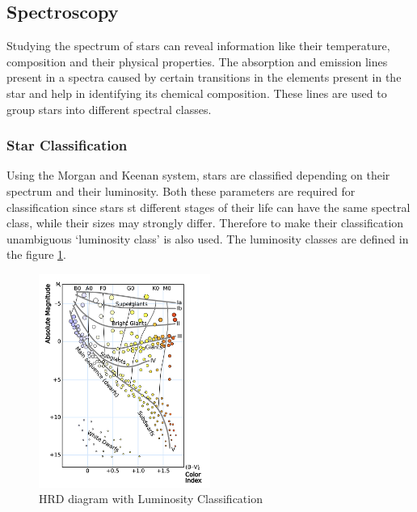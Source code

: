 \documentclass[12pt,a4paper]{article}
\begin{document}
  \subsection{Spectroscopy}
    Studying the spectrum of stars can reveal information like their temperature, composition and their physical properties. The absorption and emission lines present 
    in a spectra caused by certain transitions in the elements present in the star and help in identifying its chemical composition. These lines are used to group
    stars into different spectral classes. \\

    \subsubsection{Star Classification}
    Using the Morgan and Keenan system, stars are classified depending on their spectrum and their luminosity. Both these parameters are required for classification since 
    stars st different stages of their life can have the same spectral class, while their sizes may strongly differ. Therefore to make their classification unambiguous `luminosity class' 
    is also used. The luminosity classes are defined in the figure \ref{fig:MK}.
    \begin{figure}[H]
      \centering
      \includegraphics[width=0.5\textwidth]{Pictures/HRD_lum_class.png}
      \caption{HRD diagram with Luminosity Classification}
      \label{fig:MK}
    \end{figure}
\end{document}
